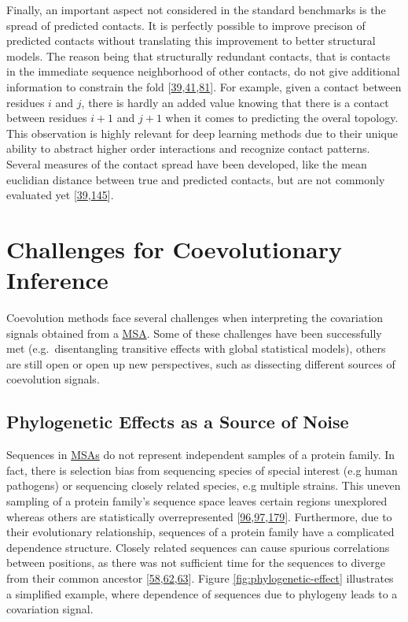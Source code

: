 \documentclass[11pt,a4paper,twoside]{book}
\theoremstyle{definition}
\theoremstyle{definition}
\theoremstyle{remark}
\begin{document}
Finally, an important aspect not considered in the standard benchmarks
is the spread of predicted contacts. It is perfectly possible to improve
precison of predicted contacts without translating this improvement to
better structural models. The reason being that structurally redundant
contacts, that is contacts in the immediate sequence neighborhood of
other contacts, do not give additional information to constrain the fold
{[}\protect\hyperlink{ref-Marks2011}{39},\protect\hyperlink{ref-Kim2014}{41},\protect\hyperlink{ref-Jones2015}{81}{]}.
For example, given a contact between residues \(i\) and \(j\), there is
hardly an added value knowing that there is a contact between residues
\(i\!+\!1\) and \(j\!+\!1\) when it comes to predicting the overal
topology. This observation is highly relevant for deep learning methods
due to their unique ability to abstract higher order interactions and
recognize contact patterns. Several measures of the contact spread have
been developed, like the mean euclidian distance between true and
predicted contacts, but are not commonly evaluated yet
{[}\protect\hyperlink{ref-Marks2011}{39},\protect\hyperlink{ref-DeOliveira2016}{145}{]}.

\section{Challenges for Coevolutionary Inference}\label{challenges}

Coevolution methods face several challenges when interpreting the
covariation signals obtained from a \protect\hyperlink{abbrev}{MSA}.
Some of these challenges have been successfully met (e.g.~disentangling
transitive effects with global statistical models), others are still
open or open up new perspectives, such as dissecting different sources
of coevolution signals.

\subsection{Phylogenetic Effects as a Source of
Noise}\label{phylogenetic-noise}

Sequences in \protect\hyperlink{abbrev}{MSAs} do not represent
independent samples of a protein family. In fact, there is selection
bias from sequencing species of special interest (e.g human pathogens)
or sequencing closely related species, e.g multiple strains. This uneven
sampling of a protein family's sequence space leaves certain regions
unexplored whereas others are statistically overrepresented
{[}\protect\hyperlink{ref-Morcos2011}{96},\protect\hyperlink{ref-Cocco2017}{97},\protect\hyperlink{ref-Marks2012}{179}{]}.
Furthermore, due to their evolutionary relationship, sequences of a
protein family have a complicated dependence structure. Closely related
sequences can cause spurious correlations between positions, as there
was not sufficient time for the sequences to diverge from their common
ancestor
{[}\protect\hyperlink{ref-Gouveia_Oliveira2007}{58},\protect\hyperlink{ref-Lapedes1999}{62},\protect\hyperlink{ref-Burger2010}{63}{]}.
Figure \ref{fig:phylogenetic-effect} illustrates a simplified example,
where dependence of sequences due to phylogeny leads to a covariation
signal.
\end{document}
